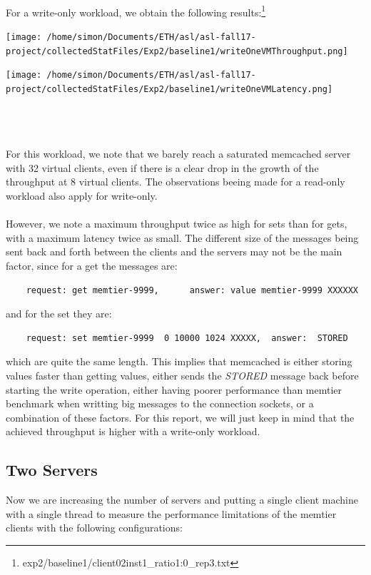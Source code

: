 \documentclass[11pt,a4paper]{article}
\begin{document}
\\
For a write-only workload, we obtain the following results:\footnote{exp2/baseline1/client02inst1\_ratio1:0\_rep3.txt}
\\
\begin{minipage}{0.5\linewidth}
\texttt{[image: /home/simon/Documents/ETH/asl/asl-fall17-project/collectedStatFiles/Exp2/baseline1/writeOneVMThroughput.png]}
\end{minipage}
\hfill
\begin{minipage}{0.5\linewidth}
\texttt{[image: /home/simon/Documents/ETH/asl/asl-fall17-project/collectedStatFiles/Exp2/baseline1/writeOneVMLatency.png]}
\end{minipage}
\\\\\\
For this workload, we note that we barely reach a saturated memcached server with 32 virtual clients, even if there is a clear drop in the growth of the throughput at 8 virtual clients. The observations beeing made for a read-only workload also apply for write-only. 
\\\\
However, we note a maximum throughput twice as high for sets than for gets, with a maximum latency twice as small. The different size of the messages being sent back and forth between the clients and the servers may not be the main factor, since for a get the messages are: 
\begin{lstlisting}
	request: get memtier-9999, 		answer: value memtier-9999 XXXXXX
\end{lstlisting}
and for the set they are:
\begin{lstlisting}
	request: set memtier-9999  0 10000 1024 XXXXX,	answer:  STORED
\end{lstlisting}
which are quite the same length. This implies that memcached is either storing values faster than getting values, either sends the \textit{STORED} message back before starting the write operation, either having poorer performance than memtier benchmark when writting big messages to the connection sockets, or a combination of these factors. For this report, we will just keep in mind that the achieved throughput is higher with a write-only workload.
   
\subsection{Two Servers}

Now we are increasing the number of servers and putting a single client machine with a single thread to measure the performance limitations of the memtier clients with the following configurations:
\end{document}
